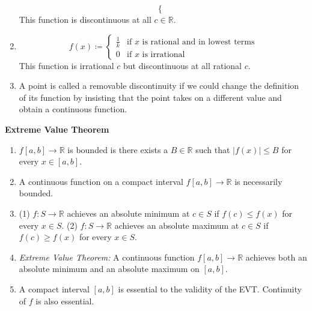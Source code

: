 \documentclass[12pt]{article}
\newcommand{\abs}[1]{\left| {#1} \right|}
\newcommand{\bR}{\mathbb{R}}
\begin{document}
\begin{enumerate}
\[\begin{cases}
	\end{cases}
	\] This function is discontinuous at all $c\in\bR$.
	\item \[f(x)\coloneq
	\begin{cases}
		\frac{1}{k} & \text{if }x\text{ is rational and in lowest terms} \\
		0 & \text{if }x\text{ is irrational}
	\end{cases}
	\] This function is irrational $c$ but discontinuous at all rational $c$.
	\item A point is called a removable discontinuity if we could change the definition of its function by insisting that the point takes on a different value and obtain a continuous function.
\end{enumerate}

\noindent \textbf{Extreme Value Theorem}

\begin{enumerate}
	\item $f[a,b]\to\bR$ is bounded is there exists a $B\in\bR$ such that $\abs{f(x)}\le B$ for every $x\in[a,b]$.
	\item A continuous function on a compact interval $f[a,b]\to\bR$ is necessarily bounded.
	\item (1) $f:S\to\bR$ achieves an absolute minimum at $c\in S$ if $f(c)\le f(x)$ for every $x\in S$. (2) $f:S\to\bR$ achieves an absolute maximum at $c\in S$ if $f(c)\ge f(x)$ for every $x\in S$.
	\item \textit{Extreme Value Theorem:} A continuous function $f[a,b]\to\bR$ achieves both an absolute minimum and an absolute maximum on $[a,b]$.
	\item A compact interval $[a,b]$ is essential to the validity of the EVT. Continuity of $f$ is also essential.
\end{enumerate}
\end{document}

